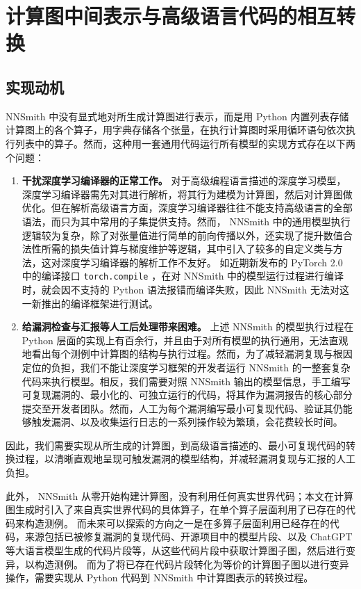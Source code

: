 
\chapter{计算图中间表示与高级语言代码的相互转换}
\label{chp:eng}

\section{实现动机}

NNSmith 中没有显式地对所生成计算图进行表示，而是用 Python 内置列表存储计算图上的各个算子，用字典存储各个张量，在执行计算图时采用循环语句依次执行列表中的算子。\cite{nnsmith_old}然而，这种用一套通用代码运行所有模型的实现方式存在以下两个问题：
\begin{enumerate}
    \item \textbf{干扰深度学习编译器的正常工作。} 对于高级编程语言描述的深度学习模型，深度学习编译器需先对其进行解析，将其行为建模为计算图，然后对计算图做优化。但在解析高级语言方面，深度学习编译器往往不能支持高级语言的全部语法，而只为其中常用的子集提供支持。然而， NNSmith 中的通用模型执行逻辑较为复杂，除了对张量值进行简单的前向传播以外，还实现了提升数值合法性所需的损失值计算与梯度维护等逻辑，其中引入了较多的自定义类与方法，这对深度学习编译器的解析工作不友好。
    如近期新发布的 PyTorch 2.0 \cite{pt2_release} 中的编译接口 \texttt{torch.compile} ，在对 NNSmith 中的模型运行过程进行编译时，就会因不支持的 Python 语法报错而编译失败，因此 NNSmith 无法对这一新推出的编译框架进行测试。
    \item \textbf{给漏洞检查与汇报等人工后处理带来困难。} 上述 NNSmith 的模型执行过程在 Python 层面的实现上有百余行，并且由于对所有模型的执行通用，无法直观地看出每个测例中计算图的结构与执行过程。然而，为了减轻漏洞复现与根因定位的负担，我们不能让深度学习框架的开发者运行 NNSmith 的一整套复杂代码来执行模型。相反，我们需要对照 NNSmith 输出的模型信息，手工编写可复现漏洞的、最小化的、可独立运行的代码，将其作为漏洞报告的核心部分提交至开发者团队。然而，人工为每个漏洞编写最小可复现代码、验证其仍能够触发漏洞、以及收集运行日志的一系列操作较为繁琐，会花费较长时间。
\end{enumerate}
因此，我们需要实现从所生成的计算图，到高级语言描述的、最小可复现代码的转换过程，以清晰直观地呈现可触发漏洞的模型结构，并减轻漏洞复现与汇报的人工负担。

此外， NNSmith 从零开始构建计算图，没有利用任何真实世界代码；本文在计算图生成时引入了来自真实世界代码的具体算子，在单个算子层面利用了已存在的代码来构造测例。
而未来可以探索的方向之一是在多算子层面利用已经存在的代码，来源包括已被修复漏洞的复现代码、开源项目中的模型片段、以及 ChatGPT\cite{chatgpt}等大语言模型生成的代码片段等，从这些代码片段中获取计算图子图，然后进行变异，以构造测例。
而为了将已存在代码片段转化为等价的计算图子图以进行变异操作，需要实现从 Python 代码到 NNSmith 中计算图表示的转换过程。

